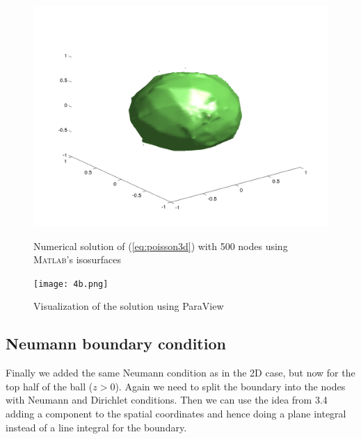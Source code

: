\documentclass[paper=a4, fontsize=11pt]{scrartcl} %
\begin{document}
\begin{figure}[!htb]
  \includegraphics[width=\linewidth]{4b500.png}
  \caption{Numerical solution of (\ref{eq:poisson3d}) with 500 nodes using \textsc{Matlab}'s isosurfaces}\label{fig:4b500}
\endminipage\hfill
{}
  \texttt{[image: 4b.png]}
  \caption{Visualization of the solution using ParaView}\label{fig:4b}
\endminipage\hfill
\end{figure}

\subsection{Neumann boundary condition}
Finally we added the same Neumann condition as in the 2D case, but now for the top half of the ball ($z>0$). Again we need to split the boundary into the nodes with Neumann and Dirichlet conditions. Then we can use the idea from 3.4 adding a component to the spatial coordinates and hence doing a plane integral instead of a line integral for the boundary.
\end{document}
